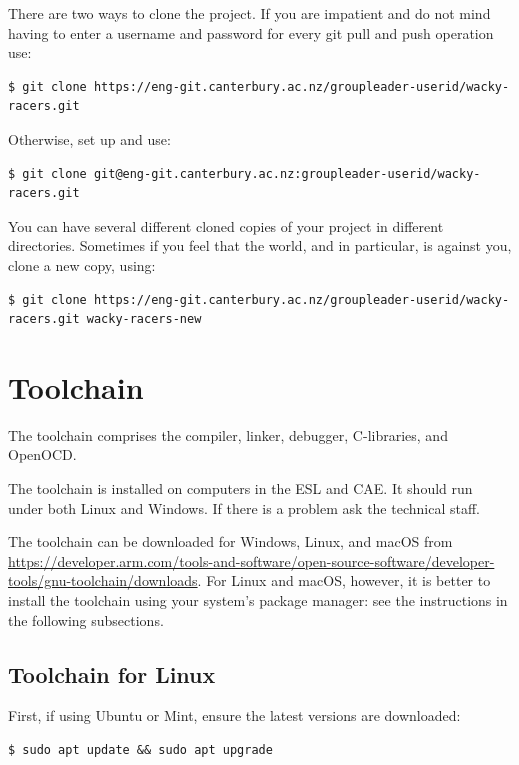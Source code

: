 There are two ways to clone the project. If you are impatient and do not
mind having to enter a username and password for every git pull and push
operation use:
%
\begin{verbatim}
$ git clone https://eng-git.canterbury.ac.nz/groupleader-userid/wacky-racers.git
\end{verbatim}

Otherwise, set up  and use:
%
\begin{verbatim}
$ git clone git@eng-git.canterbury.ac.nz:groupleader-userid/wacky-racers.git
\end{verbatim}

You can have several different cloned copies of your project in
different directories. Sometimes if you feel that the world,
and  in particular, is against you, clone a new copy,
using:
%
\begin{verbatim}
$ git clone https://eng-git.canterbury.ac.nz/groupleader-userid/wacky-racers.git wacky-racers-new
\end{verbatim}


\section{Toolchain}
\label{toolchain}

The toolchain comprises the compiler, linker, debugger, C-libraries,
and OpenOCD.

The toolchain is installed on computers in the ESL and CAE. It should
run under both Linux and Windows.  If there is a problem ask the
technical staff.

The toolchain can be downloaded for Windows, Linux, and macOS from
\url{https://developer.arm.com/tools-and-software/open-source-software/developer-tools/gnu-toolchain/downloads}.
For Linux and macOS, however, it is better to install the toolchain using your
system's package manager: see the instructions in the following subsections.


\subsection{Toolchain for Linux}

First, if using Ubuntu or Mint, ensure the latest versions are
downloaded:
%
\begin{verbatim}
$ sudo apt update && sudo apt upgrade
\end{verbatim}

